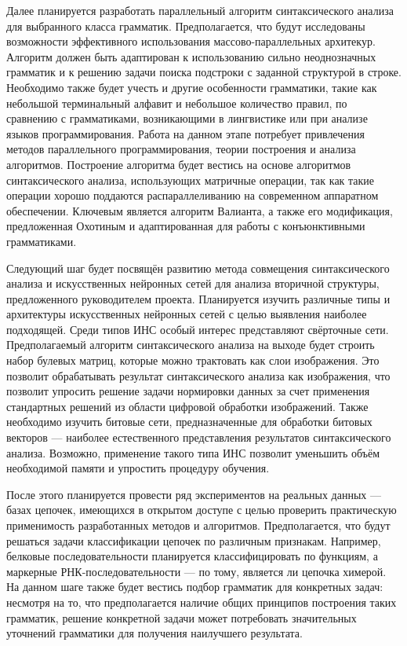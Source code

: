 \documentclass[12pt]{article}  %
\theoremstyle{remark}
\begin{document}
Далее планируется разработать параллельный алгоритм синтаксического анализа для выбранного класса грамматик.
Предполагается, что будут исследованы возможности эффективного использования массово-параллельных архитекур.
Алгоритм должен быть адаптирован к использованию сильно неоднозначных грамматик и к решению задачи поиска подстроки с заданной структурой в строке.
Необходимо также будет учесть и другие особенности грамматики, такие как небольшой терминальный алфавит и небольшое количество правил, по сравнению с грамматиками, возникающими в лингвистике или при анализе языков программирования.
Работа на данном этапе потребует привлечения методов параллельного программирования, теории построения и анализа алгоритмов.
Построение алгоритма будет вестись на основе алгоритмов синтаксического анализа, использующих матричные операции, так как такие операции хорошо поддаются распараллеливанию на современном аппаратном обеспечении.
Ключевым является алгоритм Валианта, а также его модификация, предложенная Охотиным и адаптированная для работы с конъюнктивными грамматиками.

Следующий шаг будет посвящён развитию метода совмещения синтаксического анализа и искусственных нейронных сетей для анализа вторичной структуры, предложенного руководителем проекта.
Планируется изучить различные типы и архитектуры искусственных нейронных сетей с целью выявления наиболее подходящей.
Среди типов ИНС особый интерес представляют свёрточные сети.
Предполагаемый алгоритм синтаксического анализа на выходе будет строить набор булевых матриц, которые можно трактовать как слои изображения.
Это позволит обрабатывать результат синтаксического анализа как изображения, что позволит упросить решение задачи нормировки данных за счет применения стандартных решений из области цифровой обработки изображений.
Также необходимо изучить битовые сети, предназначенные для обработки битовых векторов --- наиболее естественного представления результатов синтаксического анализа.
Возможно, применение такого типа ИНС позволит уменьшить объём необходимой памяти и упростить процедуру обучения.

После этого планируется провести ряд экспериментов на реальных данных --- базах цепочек, имеющихся в открытом доступе с целью проверить практическую применимость разработанных методов и алгоритмов.
Предполагается, что будут решаться задачи классификации цепочек по различным признакам.
Например, белковые последовательности планируется классифицировать по функциям, а маркерные РНК-последовательности --- по тому, является ли цепочка химерой.
На данном шаге также будет вестись подбор грамматик для конкретных задач: несмотря на то, что предполагается наличие общих принципов построения таких грамматик, решение конкретной задачи может потребовать значительных уточнений грамматики для получения наилучшего результата.
\end{document}
